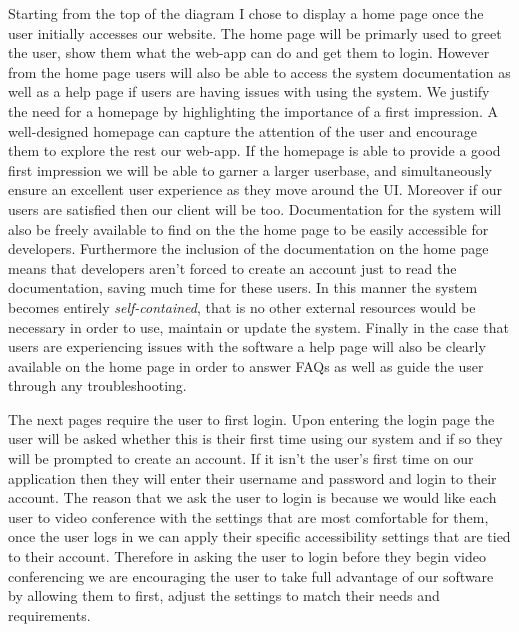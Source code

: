 Starting from the top of the diagram I chose to display a
home page once the user initially accesses our website. The 
home page will be primarly used to greet the user, show them 
what the web-app can do and get them to login. However from
the home page users will also be able to access the system 
documentation as well as a help page if users are having issues
with using the system. We justify the need for a homepage by 
highlighting the importance of a first impression. A 
well-designed homepage can capture the attention of the user
and encourage them to explore the rest our web-app. If the
homepage is able to provide a good first impression we will be
able to garner a larger userbase, and simultaneously ensure an 
excellent user experience as they move around the UI. Moreover
if our users are satisfied then our client will be too. 
Documentation for the system will also be freely available to 
find on the the home page to be easily accessible for
developers. Furthermore the inclusion of the documentation 
on the home page means that developers aren't forced to create
an account just to read the documentation, saving much time for
these users. In this manner the system becomes entirely 
\textit{self-contained}, that is no other external resources 
would be necessary in order to use, maintain or update the
system. Finally in the case that users are experiencing issues
with the software a help page will also be clearly available on
the home page in order to answer FAQs as well as guide the user
through any troubleshooting. \\ \vspace{0.2cm}

The next pages require the user to first login. Upon entering 
the login page the user will be asked whether this is their 
first time using our system and if so they will be prompted to 
create an account. If it isn't the user's first time on our 
application then they will enter their username and password
and login to their account. The reason that we ask the user to 
login is because we would like each user to video conference 
with the settings that are most comfortable for them, once the
user logs in we can apply their specific accessibility 
settings that are tied to their account. Therefore in asking
the user to login before they begin video conferencing we are 
encouraging the user to take full advantage of our software by 
allowing them to first, adjust the settings to match their 
needs and requirements. \\ \vspace{0.2cm}

